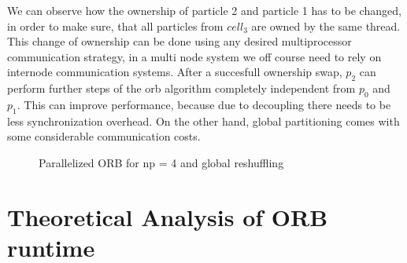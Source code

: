 \documentclass[]{article}
\begin{document}
We can observe how the ownership of particle 2 and particle 1 has to be changed, in order to make sure, that all particles from $cell_3$ are owned by the same thread. This change of ownership can be done using any desired multiprocessor communication strategy, in a multi node system we off course need to rely on internode communication systems. After a succesfull ownership swap, $p_2$ can perform further steps of the orb algorithm completely independent from $p_0$ and $p_1$. This can improve performance, because due to decoupling there needs to be less synchronization overhead. On the other hand, global partitioning comes with some considerable communication costs. 

\begin{figure}[H]
	\begin{center}
	\end{center}
	\caption{Parallelized ORB for np = 4 and global reshuffling}
	\label{fig:orb_parallel}
\end{figure}



\newpage
\section{Theoretical Analysis of ORB runtime}

\end{document}
